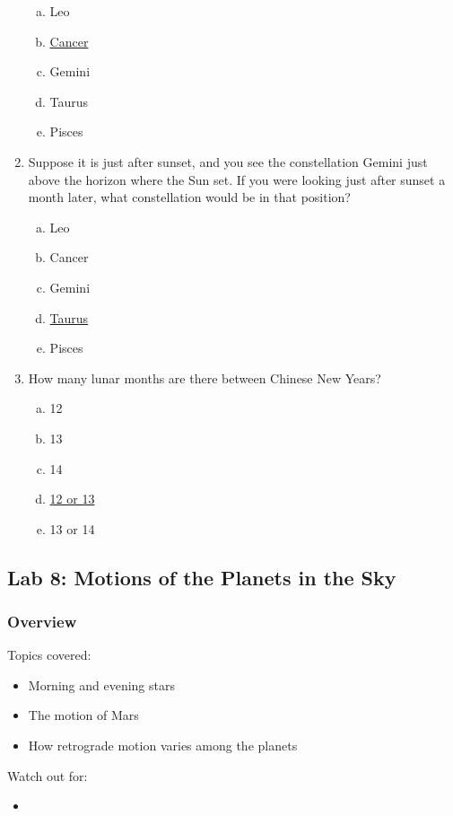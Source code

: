\documentclass[12pt]{article}
\begin{document}
\begin{enumerate}
\begin{enumerate}[a.]
    \item Leo
    \item \underline{Cancer}
    \item Gemini
    \item Taurus
    \item Pisces
\end{enumerate}
\item%
Suppose it is just after sunset, and you see the constellation Gemini just above the horizon where the Sun set. If you were looking just after sunset a month later, what constellation would be in that position?
\begin{enumerate}[a.]
    \item Leo
    \item Cancer
    \item Gemini
    \item \underline{Taurus}
    \item Pisces
\end{enumerate}
\item
How many lunar months are there between Chinese New Years?
\begin{enumerate}[a.]
    \item 12
    \item 13
    \item 14
    \item \underline{12 or 13}
    \item 13 or 14
\end{enumerate}
\end{enumerate}


\newpage
\subsection{Lab 8: Motions of the Planets in the Sky}
\subsubsection{Overview}
Topics covered:
\begin{itemize}
\item Morning and evening stars
\item The motion of Mars
\item How retrograde motion varies among the planets
\end{itemize}
Watch out for:
\begin{itemize}
\item 
\end{itemize}
\end{document}
